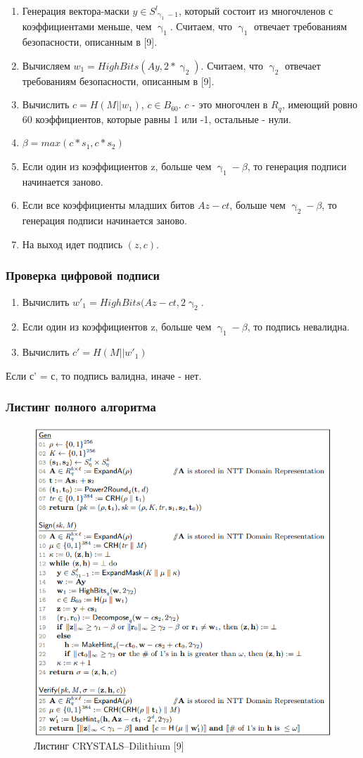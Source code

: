 \documentclass[colorthm]{./civarticle}
\begin{document}
\begin{enumerate}
    \item Генерация вектора-маски $y \in S^{l}_{\upgamma_1 - 1}$, который состоит из многочленов с коэффициентами меньше, чем $\upgamma_1$. Считаем, что $\upgamma_1$ отвечает требованиям безопасности, описанным в [9].
    \item  Вычисляем $w_1=HighBits(Ay, 2*\upgamma_2)$. Считаем, что $\upgamma_2$ отвечает требованиям безопасности, описанным в [9].
    \item Вычислить $c=H(M||w_1)$, $c \in B_{60}$. $c$ - это многочлен в $R_q$, имеющий ровно 60 коэффициентов, которые равны 1 или -1, остальные - нули.
    \item $\beta = max(c*s_1, c*s_2)$
    \item Если один из коэффициентов z, больше чем $\upgamma_1 - \beta$, то генерация подписи начинается заново. 
    \item Если все коэффициенты младших битов $Az - ct$, больше чем $\upgamma_2 - \beta$, то генерация подписи начинается заново. 
    \item На выход идет подпись $(z, c)$.
\end{enumerate}

\subsubsection{Проверка цифровой подписи}

\begin{enumerate}
    \item Вычислить $w'_1=HighBits(Az-ct, 2\upgamma_2$.
    \item Если один из коэффициентов z, больше чем $\upgamma_1 - \beta$, то подпись невалидна. 
    \item Вычислить $c'=H(M||w'_1)$ 
\end{enumerate}

Если с' = с, то подпись валидна, иначе - нет.

\subsubsection{Листинг полного алгоритма}

\begin{figure}[H]
    \centering
    \includegraphics[width=0.5\linewidth]{cryst_list.png}
    \caption{Листинг CRYSTALS–Dilithium [9]}
    \label{fig:enter-label}
\end{figure}
\end{document}
